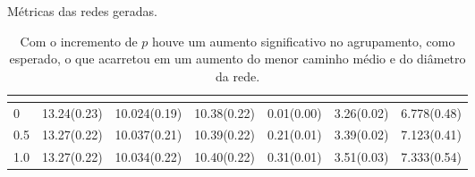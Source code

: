 \begin{table}[H]

\captionsetup{font=normalsize,skip=0.8pt,singlelinecheck=on,labelsep=endash}
\caption{Métricas das redes geradas.}
  \centering
  \hspace*{-\leftmargin}\begin{tabular}{lcccccc}

    \hline

     & 
      & 
     &
     &
     & 
     & 
         \\

    \hline
    
    0 & 13.24(0.23) & 10.024(0.19) & 10.38(0.22) & 0.01(0.00) & 3.26(0.02) & 6.778(0.48) \\
    0.5 & 13.27(0.22) & 10.037(0.21) & 10.39(0.22) & 0.21(0.01) & 3.39(0.02) & 7.123(0.41) \\
    
    1.0 & 13.27(0.22) & 10.034(0.22) & 10.40(0.22) & 0.31(0.01) & 3.51(0.03) & 7.333(0.54) \\
    \hline

    
\end{tabular}

\caption*{Com o incremento de $p$ houve um aumento significativo no agrupamento, como esperado, o que acarretou em um aumento do menor caminho médio e do diâmetro da rede.}
\label{table:rrede}
\end{table}

